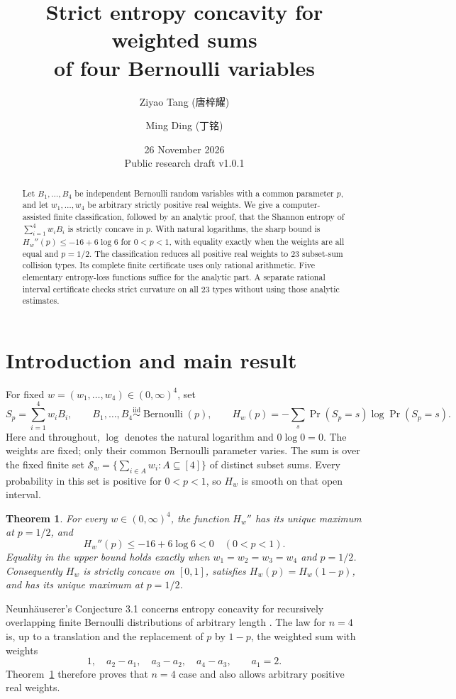 \documentclass[11pt,a4paper]{article}
\title{\color{ink}\bfseries Strict entropy concavity for weighted sums\\
of four Bernoulli variables}
\author{Ziyao Tang {\namefont(唐梓耀)}\and
Ming Ding {\namefont(丁铭)}}
\date{26 November 2026\\[2pt]{\small Public research draft v1.0.1}}
\newtheorem{theorem}{Theorem}
\newcommand{\Bern}{\operatorname{Bernoulli}}
\begin{document}
\maketitle
\begin{abstract}
Let \(B_1,\ldots,B_4\) be independent Bernoulli random variables with a
common parameter \(p\), and let \(w_1,\ldots,w_4\) be arbitrary strictly
positive real weights. We give a computer-assisted finite classification,
followed by an analytic proof, that the Shannon entropy of
\(\sum_{i=1}^4 w_iB_i\) is strictly concave in \(p\).
With natural logarithms, the sharp bound is \(H_w''(p)\le-16+6\log6\)
for \(0<p<1\), with equality exactly when the weights are all equal and
\(p=1/2\).
The classification reduces all positive real weights to 23 subset-sum
collision types. Its complete finite certificate uses only rational
arithmetic. Five elementary entropy-loss functions suffice for the
analytic part. A separate rational interval certificate checks strict
curvature on all 23 types without using those analytic estimates.
\end{abstract}

\section{Introduction and main result}
For fixed \(w=(w_1,\ldots,w_4)\in(0,\infty)^4\), set
\[
 S_p=\sum_{i=1}^4 w_iB_i,\qquad
 B_1,\ldots,B_4\overset{\mathrm{iid}}{\sim}\Bern(p),\qquad
 H_w(p)=-\sum_s \Pr(S_p=s)\log\Pr(S_p=s).
\]
Here and throughout, \(\log\) denotes the natural logarithm and
\(0\log0=0\). The weights are fixed; only their common Bernoulli
parameter varies. The sum is over the fixed finite set
\(\mathcal S_w=\{\sum_{i\in A}w_i:A\subseteq[4]\}\) of distinct
subset sums. Every probability in this set is positive for \(0<p<1\),
so \(H_w\) is smooth on that open interval.

\begin{theorem}\label{thm:main}
For every \(w\in(0,\infty)^4\), the function \(H_w''\) has its unique
maximum at \(p=1/2\), and
\[
 \boxed{H_w''(p)\le -16+6\log6<0\quad(0<p<1).}
\]
Equality in the upper bound holds exactly when \(w_1=w_2=w_3=w_4\)
and \(p=1/2\). Consequently \(H_w\) is strictly concave on \([0,1]\),
satisfies \(H_w(p)=H_w(1-p)\), and has its unique maximum at \(p=1/2\).
\end{theorem}

Neunhäuserer's Conjecture 3.1 concerns entropy concavity for recursively
overlapping finite Bernoulli distributions of arbitrary length
\cite{neunhauserer}. The law for \(n=4\) is, up to a translation and the
replacement of \(p\) by \(1-p\), the weighted sum with weights
\[
 1,\quad a_2-a_1,\quad a_3-a_2,\quad a_4-a_3,\qquad a_1=2.
\]
Theorem~\ref{thm:main} therefore proves that \(n=4\) case and also
allows arbitrary positive real weights.
\end{document}
